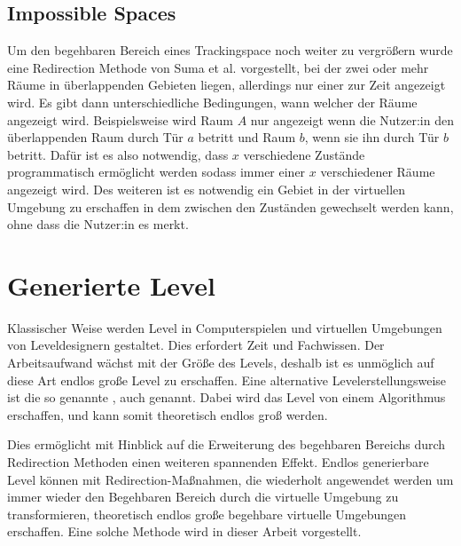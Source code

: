 \subsection{Impossible Spaces}
Um den begehbaren Bereich eines Trackingspace noch weiter zu vergrößern wurde eine Redirection Methode von Suma et al. \cite{impossible-spaces-suma} vorgestellt, bei der zwei oder mehr Räume in überlappenden Gebieten liegen, allerdings nur einer zur Zeit angezeigt wird. Es gibt dann unterschiedliche Bedingungen, wann welcher der Räume angezeigt wird. Beispielsweise wird Raum $A$ nur angezeigt wenn die Nutzer:in den überlappenden Raum durch Tür $a$ betritt und Raum $b$, wenn sie ihn durch Tür $b$ betritt.
Dafür ist es also notwendig, dass $x$ verschiedene Zustände programmatisch ermöglicht werden sodass immer einer $x$ verschiedener Räume angezeigt wird.
Des weiteren ist es notwendig ein Gebiet in der virtuellen Umgebung zu erschaffen in dem zwischen den Zuständen gewechselt werden kann, ohne dass die Nutzer:in es merkt.

\section{Generierte Level} %

Klassischer Weise werden Level in Computerspielen und virtuellen Umgebungen von Leveldesignern gestaltet. Dies erfordert Zeit und Fachwissen.
Der Arbeitsaufwand wächst mit der Größe des Levels, deshalb ist es unmöglich auf diese Art endlos große Level zu erschaffen. Eine alternative Levelerstellungsweise ist die so genannte , auch  genannt. Dabei wird das Level von einem Algorithmus erschaffen, und kann somit theoretisch endlos groß werden.

Dies ermöglicht mit Hinblick auf die Erweiterung des begehbaren Bereichs durch Redirection Methoden einen weiteren spannenden Effekt. Endlos generierbare Level können mit Redirection-Maßnahmen, die wiederholt angewendet werden um immer wieder den Begehbaren Bereich durch die virtuelle Umgebung zu transformieren, theoretisch endlos große begehbare virtuelle Umgebungen erschaffen. Eine solche  Methode wird in dieser Arbeit vorgestellt.

